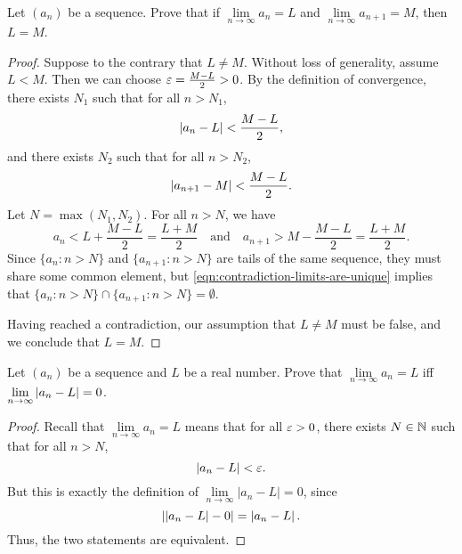 \begin{problem}
  Let $(a_{n})$ be a sequence. Prove that if $\lim\limits_{n \to \infty} a_{n} = L$ 
  and $\lim\limits_{n \to \infty} a_{n+1} = M$, then $L = M$.

  \begin{proof}
    Suppose to the contrary that $L \neq M$. Without loss of generality, assume $L < M$. Then
    we can choose $\varepsilon = \frac{M - L}{2} > 0$. By the definition of convergence, there exists $N_{1}$ such that for all $n > N_{1}$,
    \[
      \left\lvert a_{n} - L \right\rvert < \frac{M - L}{2},
    \]
    and there exists $N_{2}$ such that for all $n > N_{2}$,
    \[
      \left\lvert a_{n+1} - M \right\rvert < \frac{M - L}{2}.
    \]
    Let $N = \max(N_{1}, N_{2})$. For all $n > N$, we have
    \begin{equation}
      a_{n} < L + \frac{M - L}{2} = \frac{L + M}{2} \quad \text{and} \quad a_{n+1} > M - \frac{M - L}{2} = \frac{L + M}{2}. \label{eqn:contradiction-limits-are-unique}
    \end{equation}
    Since $\{ a_{n} : n > N \}$ and $\{ a_{n+1} : n > N \}$ are tails of the same sequence, they must share some common element,
    but \eqref{eqn:contradiction-limits-are-unique} implies that $\{ a_{n} : n > N \} \cap \{ a_{n+1} : n > N \} = \emptyset$.

    Having reached a contradiction, our assumption that $L \neq M$ must be false, and we conclude that $L = M$.
  \end{proof}

\end{problem}

\begin{problem}
  Let $(a_{n})$ be a sequence and $L$ be a real number. Prove that
  $\lim\limits_{n \to \infty} a_{n} = L$ iff $\lim\limits_{n \to \infty} \left\lvert a_{n} - L \right\rvert = 0$.

  \begin{proof}
    Recall that $\lim\limits_{n \to \infty} a_n = L$ means that for all $\varepsilon > 0$, there exists $N \in \mathbb{N}$ such that for all $n > N$,
    \[
      \left\lvert a_{n} - L \right\rvert < \varepsilon.
    \]
    But this is exactly the definition of $\lim\limits_{n \to \infty} |a_n - L| = 0$, since
    \[
      \left\lvert \left\lvert a_{n} - L \right\rvert - 0 \right\rvert = \left\lvert a_{n} - L \right\rvert.
    \]
    Thus, the two statements are equivalent.
  \end{proof}
\end{problem}

